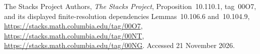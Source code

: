 The Stacks Project Authors, \emph{The Stacks Project},
Proposition~10.110.1, tag~00O7, and its displayed finite-resolution
dependencies Lemmas~10.106.6 and~10.104.9,
\url{https://stacks.math.columbia.edu/tag/00O7},
\url{https://stacks.math.columbia.edu/tag/00NT},
\url{https://stacks.math.columbia.edu/tag/00NG}.
Accessed 21 November 2026.
